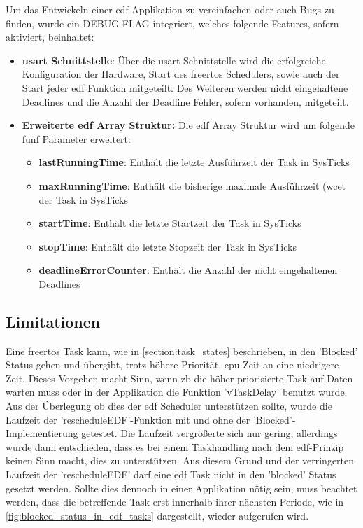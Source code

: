 \documentclass[../EDF Master Thesis.tex]{subfiles}
\begin{document}
    Um das Entwickeln einer \ac{edf} Applikation zu vereinfachen oder auch Bugs zu finden, wurde ein DEBUG-FLAG integriert, welches folgende Features, sofern aktiviert, beinhaltet:

    \begin{itemize}
        \item \textbf{\ac{usart} Schnittstelle}: Über die \ac{usart} Schnittstelle wird die erfolgreiche Konfiguration der Hardware, Start des \ac{freertos} Schedulers, sowie auch der Start jeder \ac{edf} Funktion mitgeteilt.
                                                 Des Weiteren werden nicht eingehaltene Deadlines und die Anzahl der Deadline Fehler, sofern vorhanden, mitgeteilt.
        \item \textbf{Erweiterte \ac{edf} Array Struktur:} Die \ac{edf} Array Struktur wird um folgende fünf Parameter erweitert:
        \begin{itemize}
            \item \textbf{lastRunningTime}: Enthält die letzte Ausführzeit der Task in SysTicks
            \item \textbf{maxRunningTime}: Enthält die bisherige maximale Ausführzeit (\ac{wcet} der Task in SysTicks
            \item \textbf{startTime}: Enthält die letzte Startzeit der Task in SysTicks
            \item \textbf{stopTime}: Enthält die letzte Stopzeit der Task in SysTicks
            \item \textbf{deadlineErrorCounter}: Enthält die Anzahl der nicht eingehaltenen Deadlines
        \end{itemize}
    \end{itemize}

\subsection{Limitationen} \label{section:limitationen}

    Eine \ac{freertos} Task kann, wie in \autoref{section:task_states} beschrieben, in den 'Blocked' Status gehen und übergibt, trotz höhere Priorität, \ac{cpu} Zeit an eine niedrigere Zeit.
    Dieses Vorgehen macht Sinn, wenn \ac{zb} die höher priorisierte Task auf Daten warten muss oder in der Applikation die Funktion 'vTaskDelay' benutzt wurde.
    Aus der Überlegung ob dies der \ac{edf} Scheduler unterstützen sollte, wurde die Laufzeit der 'rescheduleEDF'-Funktion mit und ohne der 'Blocked'-Implementierung getestet.
    Die Laufzeit vergrößerte sich nur gering, allerdings wurde dann entschieden, dass es bei einem Taskhandling nach dem \ac{edf}-Prinzip keinen Sinn macht, dies zu unterstützen.
    Aus diesem Grund und der verringerten Laufzeit der 'rescheduleEDF' darf eine \ac{edf} Task nicht in den 'blocked' Status gesetzt werden.  
    Sollte dies dennoch in einer Applikation nötig sein, muss beachtet werden, dass die betreffende Task erst innerhalb ihrer nächsten Periode, wie in \autoref{fig:blocked_status_in_edf_tasks} dargestellt, wieder aufgerufen wird.
\end{document}
